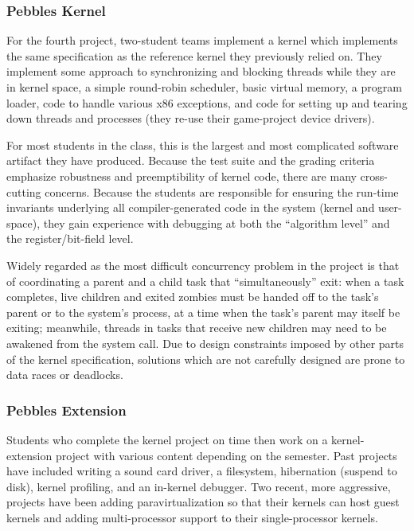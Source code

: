 \subsubsection{Pebbles Kernel}
For the fourth project, two-student teams
implement a kernel which implements the
same specification as the reference kernel
they previously relied on.
They implement some approach to
synchronizing and blocking threads while
they are in kernel space,
a simple round-robin scheduler,
basic virtual memory,
a program loader,
code to handle various x86 exceptions,
and code for setting up and tearing down
threads and processes
(they re-use their game-project device drivers).

For most students in the class, this is the
largest and most complicated software artifact they
have produced.
Because the test suite and the grading criteria
emphasize robustness and preemptibility of
kernel code,
there are many cross-cutting concerns.
%
Because the students are responsible for ensuring
the run-time invariants underlying all compiler-generated
code in the system (kernel and user-space),
they gain experience with debugging at both the
``algorithm level'' and the register/bit-field level.

Widely regarded as the most difficult concurrency problem in the project
is that of coordinating a parent and a child task that ``simultaneously''
exit:
when a task completes,
live children and exited zombies must be handed off
to the task's parent or to the system's  process,
at a time when the task's parent may itself be
exiting;
meanwhile, threads in tasks that receive new children
may need to be awakened from the  system call.
Due to design constraints imposed by other parts of the kernel specification,
solutions which are not carefully designed
are prone to data races or deadlocks.

\subsubsection{Pebbles Extension}
Students who complete the kernel project on time
then work on a kernel-extension project
{with various content depending on the semester.}
Past projects have included
writing a sound card driver,
a filesystem,
hibernation (suspend to disk),
kernel profiling,
and an in-kernel debugger.
Two recent, more aggressive, projects have been
adding paravirtualization so that their kernels
can host guest kernels and
adding multi-processor support to their single-processor kernels.

